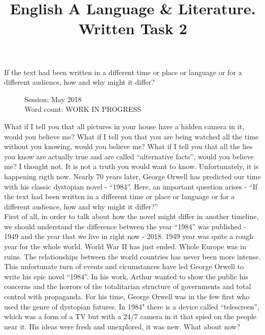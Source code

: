 \documentclass[a4paper,12pt]{article}
\title{English A Language \& Literature. Written Task 2}
\date{}
\author{}
\begin{document}
\maketitle
\begin{center}
If the text had been written in a different time or place or language or for a different audience, how and why might it differ?
\end{center}
\begin{flushleft}
\begin{figure}
Session: May 2018\\
Word count: WORK IN PROGRESS\\
\end{figure}
\end{flushleft}
\newpage



What if I tell you that all pictures in your house have a hidden camera in it, would you believe me? What if I tell you that you are being watched all the time without you knowing, would you believe me?  What if I tell you that all the lies you know are actually true and are called ``alternative facts'', would you believe me? I thought not. It is not a truth you would want to know. Unfortunately, it is happening rigth now. Nearly 70 years later, George Orwell has predicted our time with his classic dystopian novel - ``1984''. Here, an important question arises - ``If the text had been written in a different time or place or language or for a different audience, how and why might it differ?'' \\

First of all, in order to talk about how the novel might differ in another timeline, we should understand the difference between the year ``1984'' was published - 1949 and the year that we live in right now - 2018. 1949 year was quite a rough year for the whole world. World War II has just ended. Whole Europe was in ruins. The relationships between the world countries has never been more intense. This unfortunate turn of events and cicumstances have led George Orwell to write his epic novel ``1984''. In his work, Arthur wanted to show the public his concerns and the horrors of the totalitarian structure of governments and total control with propaganda. For his time, George Orwell was in the few first who used the genre of dystopian futures. In 1984" there is a device called ``telescreen'', which was a form of a TV but with a 24/7 camera in it that spied on the people near it. His ideas were fresh and unexplored, it was new. What about now?\\
\end{document}
